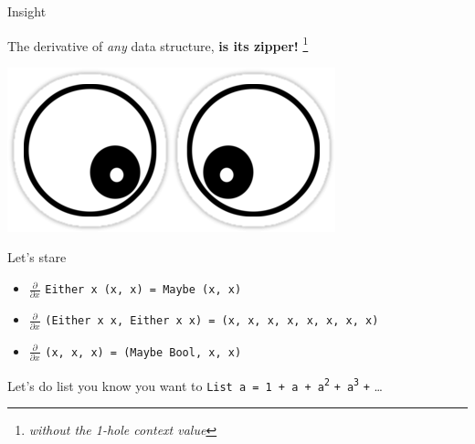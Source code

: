 \begin{frame}
\begin{block}{Insight}
\begin{center}
  The derivative of \emph{any} data structure, \textbf{is its zipper!}\cite{abbott2005data} \footnote{\emph{without the 1-hole context value}}
\end{center}
\end{block}
\end{frame}


\begin{frame}
\begin{center}
\includegraphics[width=0.3\textheight]{image/crosseyed.png}
\end{center}
\begin{block}{Let's stare}
\begin{itemize}
  \item \scriptsize{$\frac{\partial}{\partial x}$ \lstinline{Either x (x, x) = Maybe (x, x)}}
  \item \scriptsize{$\frac{\partial}{\partial x}$ \lstinline{(Either x x, Either x x) = (x, x, x, x, x, x, x, x)}}
  \item \scriptsize{$\frac{\partial}{\partial x}$ \lstinline{(x, x, x) = (Maybe Bool, x, x)}}
\end{itemize}
\end{block}
\end{frame}

\begin{frame}
\begin{block}{Let's do list \tiny{you know you want to}}
\lstinline{List a = 1 + a + a}\textsuperscript{\lstinline{2}} \lstinline{+ a}\textsuperscript{\lstinline{3}} \lstinline{+} \ldots
\end{block}
\end{frame}

